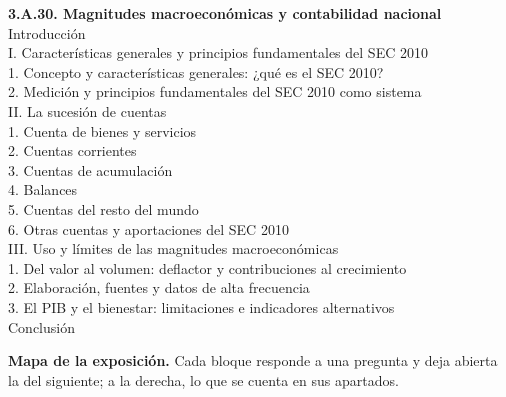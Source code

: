 \documentclass[11pt]{article}
\begin{document}
\begin{esquema}[unbreakable]
\textbf{3.A.30. Magnitudes macroeconómicas y contabilidad nacional}\\[2pt]
Introducción\\
I. Características generales y principios fundamentales del SEC 2010\\
\hspace*{1.5em}1. Concepto y características generales: ¿qué es el SEC 2010?\\
\hspace*{1.5em}2. Medición y principios fundamentales del SEC 2010 como sistema\\
II. La sucesión de cuentas\\
\hspace*{1.5em}1. Cuenta de bienes y servicios\\
\hspace*{1.5em}2. Cuentas corrientes\\
\hspace*{1.5em}3. Cuentas de acumulación\\
\hspace*{1.5em}4. Balances\\
\hspace*{1.5em}5. Cuentas del resto del mundo\\
\hspace*{1.5em}6. Otras cuentas y aportaciones del SEC 2010\\
III. Uso y límites de las magnitudes macroeconómicas\\
\hspace*{1.5em}1. Del valor al volumen: deflactor y contribuciones al crecimiento\\
\hspace*{1.5em}2. Elaboración, fuentes y datos de alta frecuencia\\
\hspace*{1.5em}3. El PIB y el bienestar: limitaciones e indicadores alternativos\\
Conclusión
\end{esquema}

\begin{anotaciones}
\textbf{Mapa de la exposición.} Cada bloque responde a una pregunta y deja abierta la del siguiente; a la derecha, lo que se cuenta en sus apartados.
\begin{infografiacaja}
\caption{Mapa de la exposición: la pregunta de cada bloque y el hilo que los une}\label{figu:mapa-tema}
\end{infografiacaja}
\end{anotaciones}
\end{document}
